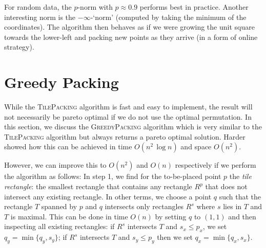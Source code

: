 \documentclass[11pt, a4paper, twocolumn]{article}
\begin{document}
For random data, the $p$-norm with $p \approx 0.9$ performs best in practice.
Another interesting norm is the $-\infty$-`norm'
(computed by taking the minimum of the coordinates). The algorithm then
behaves as if we were growing the unit square towards the lower-left
and packing new points as they arrive (in a form of online strategy).




\section{Greedy Packing}
\label{greedy}

While the \textsc{TilePacking} algorithm is fast and easy to implement,
the result will not necessarily be pareto optimal if we do not use the optimal permutation.
In this section, we discuss the \textsc{GreedyPacking} algorithm which is very similar
to the \textsc{TilePacking} algorithm but always returns a pareto optimal solution.
Harder \cite{harder2019anchoredrectanglecover} showed how this can be achieved in
time $O(n^2\, \log n)$ and space $O(n^2)$.

However, we can improve this to $O(n^2)$ and $O(n)$ respectively if we perform the algorithm as follows:
In step 1, we find for the to-be-placed point $p$ the \textit{tile rectangle}: the smallest rectangle
that contains any rectangle $R^p$ that does not intersect any existing rectangle. In other terms,
we choose a point $q$ such that the rectangle $T$ spanned by $p$ and $q$ intersects only rectangles $R^s$
where $s$ lies in $T$ and $T$ is maximal. This can be done in time $O(n)$ by setting $q$ to $(1,1)$
and then inspecting all existing rectangles: if $R^s$ intersects $T$ and $s_x \leq p_x$,
we set $q_y = \min \{q_y, s_y\}$; if $R^s$ intersects $T$ and $s_y \leq p_y$ then we set $q_x = \min \{q_x, s_x\}$.
\end{document}
